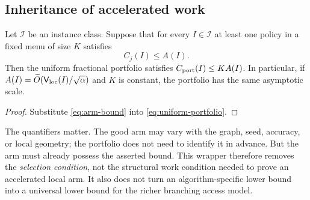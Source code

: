 \subsection{Inheritance of accelerated work}

\begin{corollary}
\label{cor:inherit}
Let $\mathcal I$ be an instance class.  Suppose that for every
$I\in\mathcal I$ at least one policy in a fixed menu of size $K$ satisfies
\begin{equation}
 C_j(I)\leq A(I).
 \label{eq:arm-bound}
\end{equation}
Then the uniform fractional portfolio satisfies
$C_{\rm port}(I)\leq K A(I)$.  In particular, if
$A(I)=\widetilde O(\mathsf V_{\rm loc}(I)/\sqrt\alpha)$ and $K$ is constant, the portfolio has
the same asymptotic scale.
\end{corollary}

\begin{proof}
Substitute \eqref{eq:arm-bound} into \eqref{eq:uniform-portfolio}.
\end{proof}

The quantifiers matter.  The good arm may vary with the graph, seed,
accuracy, or local geometry; the portfolio does not need to identify it in
advance.  But the arm must already possess the asserted bound.  This wrapper
therefore removes the \emph{selection condition}, not the structural work
condition needed to prove an accelerated local arm.  It also does not turn an
algorithm-specific lower bound into a universal lower bound for the richer
branching access model.
